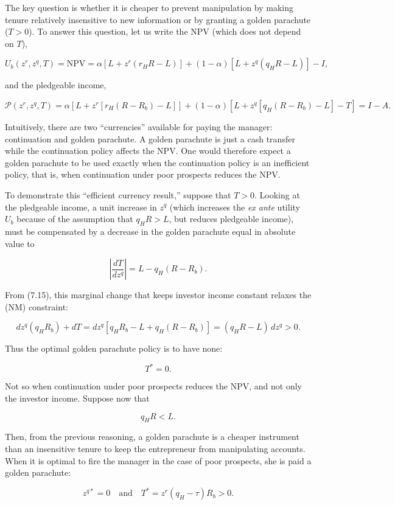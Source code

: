 \documentclass[11pt,a4paper]{article}
\begin{document}
The key question is whether it is cheaper to prevent manipulation by making tenure relatively
insensitive to new information or by granting a golden parachute (\(T > 0\)). To answer this
question, let us write the NPV (which does not depend on \(T\)),

\[U_b(z^r, z^q, T) = \text{NPV} = \alpha[L + z^r(r_H R - L)] + (1 - \alpha)[L + z^q(q_H R - L)] - I,\]

and the pledgeable income,

\[\mathcal{P}(z^r, z^q, T) = \alpha[L + z^r[r_H(R - R_b) - L]] + (1 - \alpha)[L + z^q[q_H(R - R_b) - L] - T] = I - A.\]

Intuitively, there are two ``currencies'' available for paying the manager: continuation and golden
parachute. A golden parachute is just a cash transfer while the continuation policy affects the NPV.
One would therefore expect a golden parachute to be used exactly when the continuation policy is an
inefficient policy, that is, when continuation under poor prospects reduces the NPV.

To demonstrate this ``efficient currency result,'' suppose that \(T > 0\). Looking at the pledgeable
income, a unit increase in \(z^q\) (which increases the \emph{ex ante} utility \(U_b\) because of
the assumption that \(q_H R > L\), but reduces pledgeable income), must be compensated by a decrease
in the golden parachute equal in absolute value to

\[\left|\frac{dT}{dz^q}\right| = L - q_H(R - R_b).\]

From (7.15), this marginal change that keeps investor income constant relaxes the (NM) constraint:

\[dz^q(q_H R_b) + dT = dz^q[q_H R_b - L + q_H(R - R_b)] = (q_H R - L)\,dz^q > 0.\]

Thus the optimal golden parachute policy is to have none:

\[T^* = 0.\]

Not so when continuation under poor prospects reduces the NPV, and not only the investor income.
Suppose now that

\[q_H R < L.\]

Then, from the previous reasoning, a golden parachute is a cheaper instrument than an insensitive
tenure to keep the entrepreneur from manipulating accounts. When it is optimal to fire the manager
in the case of poor prospects, she is paid a golden parachute:

\[z^{q*} = 0 \quad\text{and}\quad T^* = z^r(q_H - \tau)R_b > 0.\]
\end{document}
